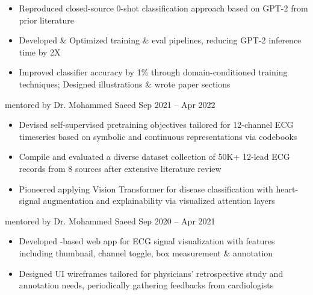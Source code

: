 {\begin{itemize}
        \item Reproduced closed-source 0-shot classification approach based on GPT-2 from prior literature

        \item Developed \& Optimized training \& eval pipelines, reducing GPT-2 inference time by 2X

        \item Improved classifier accuracy by 1\% through domain-conditioned training techniques; Designed illustrations \& wrote paper sections
    \end{itemize}
    \dividerSmall


        {{\bodyfontsize \color{body} mentored by} Dr. Mohammed Saeed}%
        {Sep 2021 -- Apr 2022}
        {}{}%
    \begin{itemize}%
        \item Devised self-supervised pretraining objectives tailored for 12-channel ECG timeseries based on symbolic and continuous representations via codebooks%
        \item Compile and evaluated a diverse dataset collection of 50K+ 12-lead ECG records from 8 sources after extensive literature review%
        \item Pioneered applying Vision Transformer for disease classification with heart-signal augmentation and explainability via visualized attention layers%
    \end{itemize}%
    \dividerSmall
        {{\bodyfontsize \color{body} mentored by} Dr. Mohammed Saeed}%
        {Sep 2020 -- Apr 2021}
        {}{}%
    \begin{itemize}%
        \item Developed -based web app for ECG signal visualization
        with features including thumbnail, channel toggle, box measurement \& annotation%
        \item Designed UI wireframes tailored for physicians' retrospective study and annotation needs, periodically gathering feedbacks from cardiologists%
    \end{itemize}%
    \dividerSmall

}
